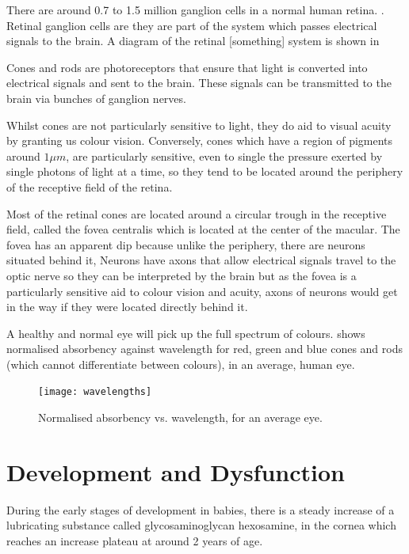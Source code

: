 There are around 0.7 to 1.5 million ganglion cells in a normal human retina.
\cite{curcio1990topography}. Retinal ganglion cells are  they are part of
the system which passes electrical signals to the brain.
\cite{meyer1995characterization} A diagram of the retinal [something] system
is shown in 

Cones and rods are photoreceptors that ensure that light is converted into
electrical signals  and sent to the brain. These signals can
be transmitted to the brain via bunches of ganglion nerves.

Whilst cones are not particularly sensitive to light, they do aid to visual
acuity by granting us colour vision.\cite{bowmaker1980visual} Conversely, cones
which have a region of pigments around $1\mu{m}$, are particularly sensitive,
even to single the pressure exerted by single photons of light at a time,
so they tend to be located around the periphery of the receptive field of
the retina.\cite{liebman1964sensitive,baylor1979responses}

Most of the retinal cones are located around a circular trough in the
receptive field, called the fovea centralis which is located at the center
of the macular.\cite{hendrickson1994primate} The fovea has an apparent dip
because unlike the periphery, there are neurons situated behind it, Neurons
have axons that allow electrical signals travel to the optic nerve so they
can be interpreted by the brain but as the fovea is a particularly sensitive
aid to colour vision and acuity, axons of neurons would get in the way if
they were located directly behind it.

A healthy and normal eye will pick up the full spectrum of colours.
 shows normalised absorbency against wavelength
for red, green and blue cones and rods (which cannot differentiate
between colours), in an average, human eye.

\begin{figure}[htbp]
  \centering
    \texttt{[image: wavelengths]}
  \caption{Normalised absorbency vs. wavelength, for an average eye.}
  \label{fig:wavelengths}
\end{figure}

\section{Development and Dysfunction}

During the early stages of development in babies, there is a steady
increase of a lubricating substance called glycosaminoglycan hexosamine,
in the cornea which reaches an increase plateau at around 2 years of age.
\cite{praus1975glycosaminoglycans}

